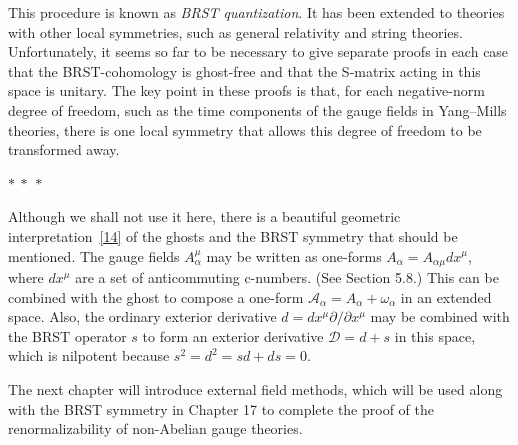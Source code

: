 This procedure is known as \emph{BRST quantization}. It has been extended to theories with other local symmetries, such as general relativity and string theories. Unfortunately, it seems so far to be necessary to give separate proofs in each case that the BRST-cohomology is ghost-free and that the S-matrix acting in this space is unitary. The key point in these proofs is that, for each negative-norm degree of freedom, such as the time components of the gauge fields in Yang--Mills theories, there is one local symmetry that allows this degree of freedom to be transformed away.

\begin{center}
$*\ *\ *$
\end{center}

Although we shall not use it here, there is a beautiful geometric interpretation~\hyperref[ch15-ref-14]{[14]} of the ghosts and the BRST symmetry that should be mentioned. The gauge fields $A_\alpha^\mu$ may be written as one-forms $A_\alpha=A_{\alpha\mu}dx^\mu$, where $dx^\mu$ are a set of anticommuting c-numbers. (See Section 5.8.) This can be combined with the ghost to compose a one-form $\mathcal A_\alpha=A_\alpha+\omega_\alpha$ in an extended space. Also, the ordinary exterior derivative $d=dx^\mu\partial/\partial x^\mu$ may be combined with the BRST operator $s$ to form an exterior derivative $\mathcal D=d+s$ in this space, which is nilpotent because $s^2=d^2=sd+ds=0$.

The next chapter will introduce external field methods, which will be used along with the BRST symmetry in Chapter 17 to complete the proof of the renormalizability of non-Abelian gauge theories.
